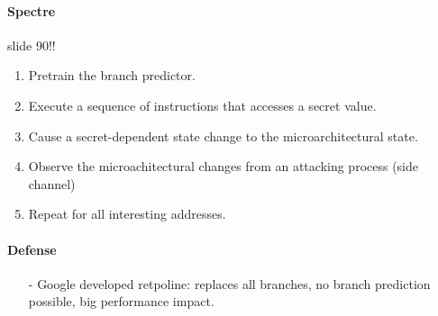 \paragraph{Spectre}
slide 90!!
\begin{enumerate}
    \item Pretrain the branch predictor.
    \item Execute a sequence of instructions that accesses a secret value.
    \item Cause a secret-dependent state change to the microarchitectural state.
    \item Observe the microachitectural changes from an attacking process (side channel)
    \item Repeat for all interesting addresses.
\end{enumerate}

\paragraph{Defense}
\begin{itemize}
    \item[-]Google developed retpoline: replaces all branches, no branch prediction possible, big performance impact. 
\end{itemize}